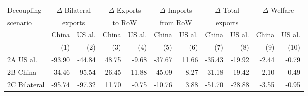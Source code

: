 \begin{tabular}{lrrrrrrrrrr}
  \hline
  Decoupling & \multicolumn{2}{c}{$\Delta$ Bilateral} & \multicolumn{2}{c}{$\Delta$ Exports} & \multicolumn{2}{c}{$\Delta$ Imports} & \multicolumn{2}{c}{$\Delta$ Total} & \multicolumn{2}{c}{$\Delta$ Welfare}\\
scenario & \multicolumn{2}{c}{exports} & \multicolumn{2}{c}{to RoW} & \multicolumn{2}{c}{from RoW} & \multicolumn{2}{c}{exports} & }\\\cmidrule{2-11}
& China & US al. & China & US al. & China & US al. & China & US al. & China & US al.} \\
& (1) & (2) & (3) & (4) & (5) & (6) & (7) & (8) & (9) & (10)} \\
 \hline
2A US al. & -93.90 & -44.84 & 48.75 & -9.68 & -37.67 & 11.66 & -35.43 & -19.92 & -2.44 & -0.79 \\ 
  2B China & -34.46 & -95.54 & -26.45 & 11.88 & 45.09 & -8.27 & -31.18 & -19.42 & -2.10 & -0.49 \\ 
  2C Bilateral & -95.74 & -97.32 & 11.70 & -0.75 & -10.76 & 3.88 & -51.70 & -28.88 & -3.55 & -0.95 \\ 
   \hline
\end{tabular}
